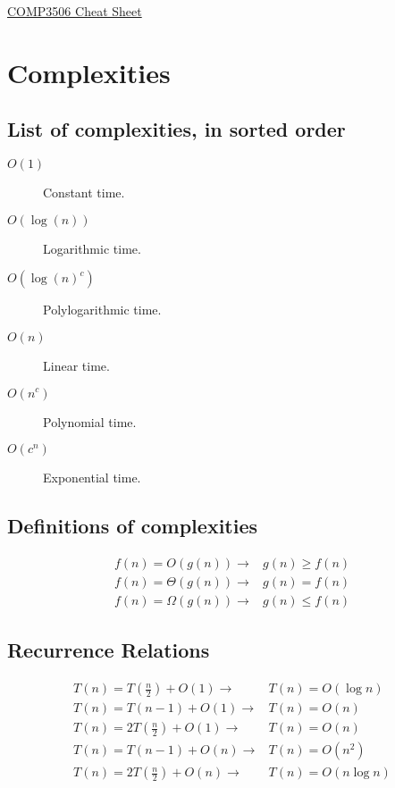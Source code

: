 \documentclass[landscape]{cheat}
\begin{document}
\footnotesize
\begin{multicols}{3}

\begin{center}
\Large{\underline{COMP3506 Cheat Sheet}} \\
\end{center}


\section{Complexities}

\subsection{List of complexities, in sorted order}
\begin{description}
    \item[$O(1)$] Constant time.
    \item[$O(\log(n))$] Logarithmic time.
    \item[$O(\log(n)^c)$] Polylogarithmic time.
    \item[$O(n)$] Linear time.
    \item[$O(n^c)$] Polynomial time.
    \item[$O(c^n)$] Exponential time.
\end{description}

\subsection{Definitions of complexities}
\begin{align*}
    f(n) = O(g(n)) \rightarrow& g(n) \geq f(n) \\
    f(n) = \Theta(g(n)) \rightarrow& g(n) = f(n) \\
    f(n) = \Omega(g(n)) \rightarrow& g(n) \leq f(n)
\end{align*}

\subsection{Recurrence Relations}
\begin{align*}
    T(n) = T(\frac n 2) + O(1) \rightarrow& T(n) = O(\log n) \\
    T(n) = T(n - 1) + O(1) \rightarrow& T(n) = O(n) \\
    T(n) = 2 T(\frac n 2) + O(1) \rightarrow& T(n) = O(n) \\
    T(n) = T(n - 1) + O(n) \rightarrow& T(n) = O(n^2) \\
    T(n) = 2 T(\frac n 2) + O(n) \rightarrow& T(n) = O(n \log n)
\end{align*}


\end{multicols}
\end{document}
